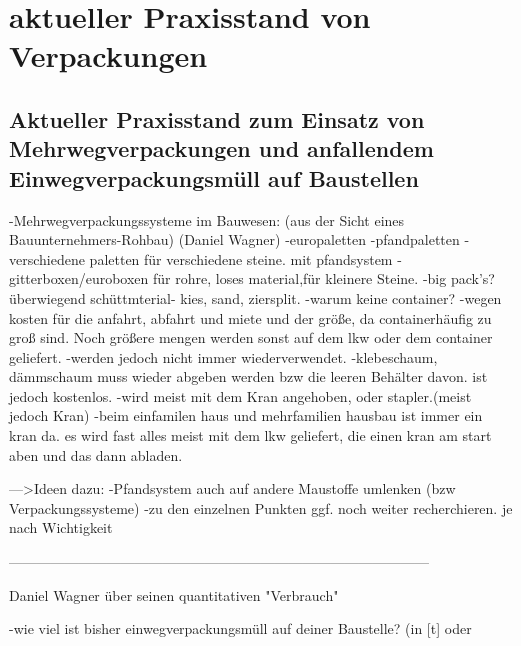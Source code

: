 
\chapter{aktueller Praxisstand von Verpackungen}
\label{sec:aktueller Praxisstand von Verpackungen}

\section{Aktueller Praxisstand zum Einsatz von Mehrwegverpackungen und anfallendem Einwegverpackungsmüll auf Baustellen}        
\label{sec:aktueller Praxisstand von Verpackungen:Aktueller Praxisstand zum Einsatz von Mehrwegverpackungen und anfallendem Einwegverpackungsmüll auf Baustellen}


    -Mehrwegverpackungssysteme im Bauwesen: (aus der Sicht eines Bauunternehmers-Rohbau)
    (Daniel Wagner)
        -europaletten
        -pfandpaletten
        -verschiedene paletten für verschiedene steine. mit pfandsystem
        -gitterboxen/euroboxen für rohre, loses material,für kleinere Steine.
        -big pack's? überwiegend schüttmterial- kies, sand, ziersplit.
                -warum keine container?
                    -wegen kosten für die anfahrt, abfahrt und miete und der größe, da containerhäufig zu groß sind. Noch größere mengen werden sonst auf dem lkw oder dem container geliefert.
                -werden jedoch nicht immer wiederverwendet.
        -klebeschaum, dämmschaum muss wieder abgeben werden bzw die leeren Behälter davon. ist jedoch kostenlos. 
        -wird meist mit dem Kran angehoben, oder stapler.(meist jedoch Kran)
            -beim einfamilen haus und mehrfamilien hausbau ist immer ein kran da. es wird fast alles meist mit dem lkw geliefert, die einen kran am start aben und das dann abladen.
        
        --->Ideen dazu: 
                -Pfandsystem auch auf andere Maustoffe umlenken (bzw Verpackungssysteme)
                -zu den einzelnen Punkten ggf. noch weiter recherchieren. je nach Wichtigkeit

------------------------------------------------------------------------------------------

Daniel Wagner über seinen quantitativen "Verbrauch"

        -wie viel ist bisher einwegverpackungsmüll auf deiner Baustelle? (in [t] oder %
        

